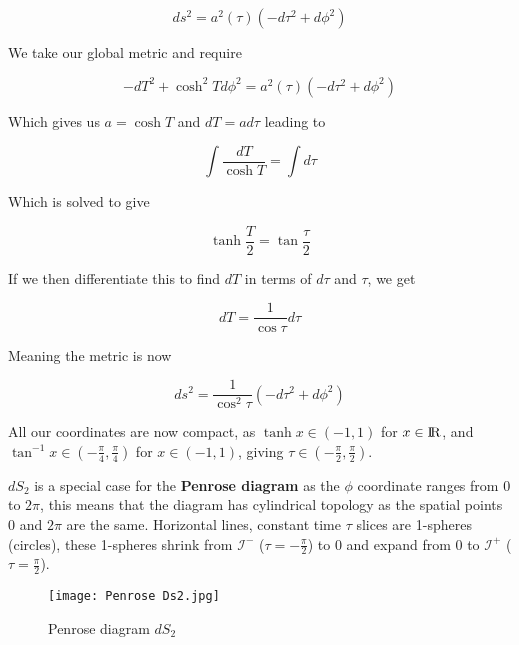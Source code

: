 \documentclass[a4paper,11pt]{article}
\numberwithin{equation}{section}
\numberwithin{figure}{section}
\begin{document}
\begin{large}
\begin{equation}
\label{Pen_metric_form}
    ds^2=a^2(\tau)(-d\tau^2+d\phi^2)
\end{equation}

We take our global metric and require

\begin{equation}
\label{Glob=Pen}
    -dT^2+\cosh ^2 T d\phi^2=a^2(\tau)(-d\tau^2+d\phi^2)
\end{equation}


Which gives us $a=\cosh T$ and $dT=a d\tau$ leading to

\begin{equation}
\label{Int1}
    \int \frac{dT}{\cosh T}= \int d\tau
\end{equation}

Which is solved to give

\begin{equation}
\label{T_tau_rel}
    \tanh \frac{T}{2}=\tan \frac{\tau}{2}
\end{equation}


If we then differentiate this to find $dT$ in terms of $d\tau$ and $\tau$, we get

\begin{equation}
\label{dT_dtau_rel}
    dT=\frac{1}{\cos\tau}d\tau
\end{equation}

Meaning the metric is now 

\begin{equation}
\label{compact_global_metric}
    ds^2=\frac{1}{\cos^2\tau}(-d\tau^2+d\phi^2)
\end{equation}

All our coordinates are now compact, as $\tanh x \in (-1,1)$ for $x \in {\rm I\!R}$, and $\tan^{-1} x \in (-\frac{\pi}{4},\frac{\pi}{4})$ for $x \in (-1,1)$, giving $\tau \in (-\frac{\pi}{2},\frac{\pi}{2})$.

$dS_2$ is a special case for the \textbf{Penrose diagram} as the $\phi$ coordinate ranges from $0$ to $2\pi$, this means that the diagram has cylindrical topology as the spatial points $0$ and $2\pi$ are the same. Horizontal lines, constant time $\tau$ slices are 1-spheres (circles), these 1-spheres shrink from $\mathcal{I}^-$ ($\tau=-\frac{\pi}{2}$) to $0$ and expand from $0$ to $\mathcal{I}^+$ ($\tau=\frac{\pi}{2}$).

\newpage


\begin{figure}[h]
    \centering
    \texttt{[image: Penrose Ds2.jpg]}
    \caption{Penrose diagram $dS_2$}
    \label{fig:penrose_dS2}
    

\end{figure}
\end{large}
\end{document}
